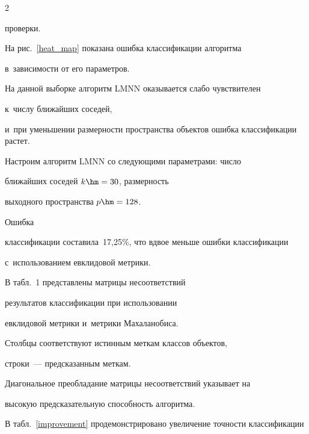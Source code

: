




\begin{multicols}{2}





 





\noindent


 про\-вер\-ки.


На рис.~\ref{heat_map} показана ошибка классификации алгоритма 


в~зависимости от его параметров.


На данной выборке алгоритм LMNN оказывается слабо чувствителен 


к~числу ближайших соседей,


и~при уменьшении размерности пространства объектов ошибка классификации растет.








Настроим алгоритм LMNN со следующими параметрами: число 


ближайших соседей $k \hm= 30$, размерность


выходного пространства $p \hm= 128$.


Ошибка


 классификации составила~17,25\%, что вдвое меньше ошибки классификации 


с~использованием евклидовой метрики.








В табл.~1 представлены матрицы несоответствий 


результатов классификации при использовании


евклидовой метрики и~метрики Махаланобиса.


Столбцы соответствуют истинным меткам классов объектов, 


строки~--- предсказанным меткам.


Диагональное преобладание матрицы несоответствий указывает на 


высокую предсказательную способность алгоритма.





В табл.~\ref{improvement} продемонстрировано увеличение точности классификации 



\end{multicols}
